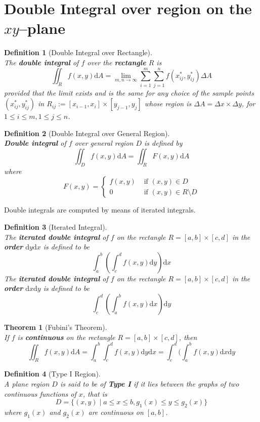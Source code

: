 \documentclass[12pt]{article}
\newtheorem{definition}{Definition}[section]
\newtheorem{theorem}{Theorem}[section]
\theoremstyle{definition}
\newcommand{\diff}{\mathrm{d}}
\begin{document}
\section{Double Integral over region on the $xy$--plane}
\begin{definition}[Double Integral over Rectangle]
\hfill\\\normalfont The \textbf{double integral} of $f$ over the \textbf{rectangle} $R$ is
\[
\iint_Rf(x,y)\diff A = \lim_{m,n\to\infty}\sum_{i=1}^m\sum_{j=1}^n f(x_{ij}^\ast,y_{ij}^\ast)\Delta A
\] 
provided that the limit exists and is the same for any choice of the sample points $(x_{ij}^\ast, y_{ij}^\ast)$ in $R_{ij}:=[x_{i-1},x_i]\times[y_{j-1},y_j]$ whose region is $\Delta A = \Delta x\times\Delta y$, for $1\leq i\leq m, 1\leq j\leq n$.
\end{definition}
\begin{definition}[Double Integral over General Region]
\hfill\\\normalfont \textbf{Double integral} of $f$ over general region $D$ is defined by
\[
\iint_D f(x,y)\diff A = \iint_R F(x,y)\diff A
\] 
where 
\[
F(x,y)=\begin{cases}f(x,y)&\text{ if }(x,y)\in D\\0&\text{ if }(x,y)\in R\setminus D\end{cases}
\]
\end{definition}
Double integrals are computed by means of iterated integrals.
\begin{definition}[Iterated Integral]
\hfill\\\normalfont The \textbf{iterated double integral} of $f$ on the rectangle $R = [a,b]\times[c,d]$ in the \textbf{order} $\diff y\diff x$ is defined to be
\[
\int_a^b\left(\int_c^df(x,y)\diff y\right)\diff x
\] 
The \textbf{iterated double integral} of $f$ on the rectangle $R = [a,b]\times[c,d]$ in the \textbf{order} $\diff x\diff y$ is defined to be
\[
\int_c^d\left(\int_a^bf(x,y)\diff x\right)\diff y
\] 
\end{definition}
\begin{theorem}[Fubini's Theorem]
\hfill\\\normalfont If $f$ is \textbf{continuous} on the rectangle $R=[a,b]\times[c,d]$, then
\[
\iint_R f(x,y)\diff A = \int_a^b\int_c^df(x,y)\diff y\diff x =\int_c^d(\int_a^bf(x,y)\diff x\diff y
\]
\end{theorem}
\begin{definition}[Type I Region]
\hfill\\\normalfont A plane region $D$ is said to be of \textbf{Type I} if it lies between the graphs of two continuous functions of $x$, that is
\[
D=\{(x,y)\mid a\leq x\leq b, g_1(x)\leq y\leq g_2(x)\}
\]
where $g_1(x)$ and $g_2(x)$ are continuous on $[a,b]$.
\end{definition}
\end{document}
